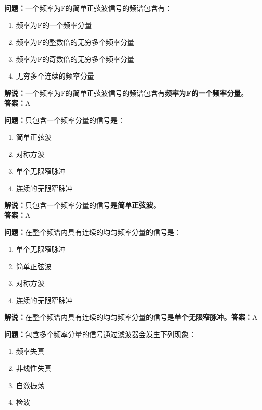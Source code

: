 \textbf{问题：}一个频率为F的简单正弦波信号的频谱包含有：

\begin{enumerate}[label=\Alph*), leftmargin=1cm]
	\item 频率为F的一个频率分量
	\item 频率为F的整数倍的无穷多个频率分量
	\item 频率为F的奇数倍的无穷多个频率分量
	\item 无穷多个连续的频率分量
\end{enumerate}

\textbf{解说：}一个频率为F的简单正弦波信号的频谱包含有\textbf{频率为F的一个频率分量}。\\\textbf{答案：}A%



\textbf{问题：}只包含一个频率分量的信号是：
\begin{enumerate}[label=\Alph*), leftmargin=1cm]
	\item 简单正弦波
	\item 对称方波
	\item 单个无限窄脉冲
	\item 连续的无限窄脉冲
\end{enumerate}

\textbf{解说：}只包含一个频率分量的信号是\textbf{简单正弦波}。\\\textbf{答案：}A%



\textbf{问题：}在整个频谱内具有连续的均匀频率分量的信号是：

\begin{enumerate}[label=\Alph*), leftmargin=1cm]
	\item 单个无限窄脉冲
	\item 简单正弦波
	\item 对称方波
	\item 连续的无限窄脉冲
\end{enumerate}

\textbf{解说：}在整个频谱内具有连续的均匀频率分量的信号是\textbf{单个无限窄脉冲}。\textbf{答案：}A%



\textbf{问题：}包含多个频率分量的信号通过滤波器会发生下列现象：

\begin{enumerate}[label=\Alph*), leftmargin=1cm]
	\item 频率失真
	\item 非线性失真
	\item 自激振荡
	\item 检波
\end{enumerate}


